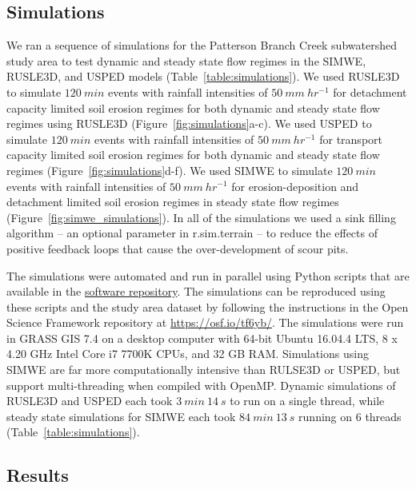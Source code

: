\documentclass[esurf, manuscript]{copernicus}
\begin{document}
\subsection{Simulations}
%
We ran a sequence of simulations 
for the Patterson Branch Creek subwatershed study area
to test dynamic and steady state flow regimes
in the SIMWE, RUSLE3D, and USPED models
(Table~\ref{table:simulations}).
%
We used RUSLE3D to simulate $120~min$ events
with rainfall intensities of $50~mm~hr^{-1}$
for detachment capacity limited soil erosion regimes
for both dynamic and steady state flow regimes
using RUSLE3D
(Figure~\ref{fig:simulations}a-c).
% 
We used USPED to simulate $120~min$ events
with rainfall intensities of $50~mm~hr^{-1}$
for transport capacity limited soil erosion regimes
for both dynamic and steady state flow regimes
(Figure~\ref{fig:simulations}d-f).
%
We used SIMWE to simulate $120~min$ events 
with rainfall intensities of $50~mm~hr^{-1}$
for erosion-deposition 
and detachment limited soil erosion regimes 
in steady state flow regimes
(Figure~\ref{fig:simwe_simulations}).
%
In all of the simulations 
we used a sink filling algorithm 
-- an optional parameter in r.sim.terrain --  
to reduce the effects of positive feedback loops
that cause the over-development of scour pits. 

The simulations were automated and run in parallel
using Python scripts that are available in the 
\href{https://github.com/baharmon/landscape_evolution}{software repository}.
The simulations can be reproduced using these scripts
and the study area dataset 
by following the instructions 
in the Open Science Framework repository 
at \url{https://osf.io/tf6yb/}.
The simulations were run 
in GRASS GIS 7.4 
on a desktop computer 
with 64-bit Ubuntu 16.04.4 LTS,
8 x 4.20 GHz Intel Core i7 7700K CPUs,
and 32 GB RAM. 
Simulations using SIMWE 
are far more computationally intensive
than RULSE3D or USPED, 
but support multi-threading 
when compiled with OpenMP. 
Dynamic simulations of RUSLE3D and USPED each took
$3~min~14~s$ to run on a single thread, 
while steady state simulations for SIMWE each took 
$84~min~13~s$ running on 6 threads
(Table~\ref{table:simulations}).


\subsection{Results}
\end{document}
